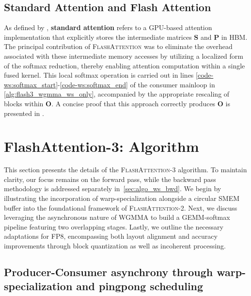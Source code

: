 \subsection{Standard Attention and Flash Attention} As defined by \citet{dao2022flashattention}, \textbf{standard attention} refers to a GPU-based attention implementation that explicitly stores the intermediate matrices $\mathbf{S}$ and $\mathbf{P}$ in HBM. The principal contribution of \textsc{FlashAttention} was to eliminate the overhead associated with these intermediate memory accesses by utilizing a localized form of the softmax reduction, thereby enabling attention computation within a single fused kernel. This local softmax operation is carried out in lines \ref{code-ws:softmax_start}-\ref{code-ws:softmax_end} of the consumer mainloop in \cref{alg:flash3_wgmma_ws_only}, accompanied by the appropriate rescaling of blocks within $\mathbf{O}$. A concise proof that this approach correctly produces $\mathbf{O}$ is presented in \cite[\S 2.3.1]{dao2023flashattention2}.

\section{FlashAttention-3: Algorithm}
\label{sec:algo}

This section presents the details of the \textsc{FlashAttention-3} algorithm. To maintain clarity, our focus remains on the forward pass, while the backward pass methodology is addressed separately in~\cref{sec:algo_ws_bwd}. We begin by illustrating the incorporation of warp-specialization alongside a circular SMEM buffer into the foundational framework of \textsc{FlashAttention-2}. Next, we discuss leveraging the asynchronous nature of WGMMA to build a GEMM-softmax pipeline featuring two overlapping stages. Lastly, we outline the necessary adaptations for FP8, encompassing both layout alignment and accuracy improvements through block quantization as well as incoherent processing.

\subsection{Producer-Consumer asynchrony through warp-specialization and pingpong scheduling}
\label{sec:algo_ws}

